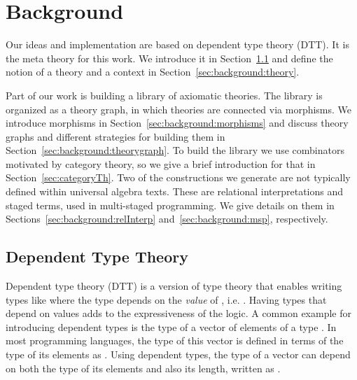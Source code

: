 \chapter{Background}
\label{ch:background}
Our ideas and implementation are based on dependent type theory (DTT). It is the meta theory for this work. We introduce it in Section~\ref{subsec:background:dtt} and define the notion of a theory and a context in Section~\ref{sec:background:theory}.

Part of our work is building a library of axiomatic theories. The library is organized as a theory graph, in which theories are connected via morphisms. We introduce morphisms in Section~\ref{sec:background:morphisms} and discuss theory graphs and different strategies for building them in Section~\ref{sec:background:theorygraph}. 
To build the library we use combinators motivated by category theory, so we give a brief introduction for that in Section~\ref{sec:categoryTh}. 
Two of the constructions we generate are not typically defined within universal algebra texts. These are relational interpretations and staged terms, used in multi-staged programming. We give details on them in Sections~\ref{sec:background:relInterp} and~\ref{sec:background:msp}, respectively. 

\section{Dependent Type Theory}
\label{subsec:background:dtt}
Dependent type theory (DTT) is a version of type theory that enables writing types like 
where the type  depends on the \emph{value} of , i.e. . 
Having types that depend on values adds to the expressiveness of the logic. A common example for introducing dependent types is the type of a vector of  elements of a type . 
In most programming languages, the type of this vector is defined in terms of the type of its elements as . Using dependent types, the type of a vector can depend on both the type of its elements and also its length, written as .
 
